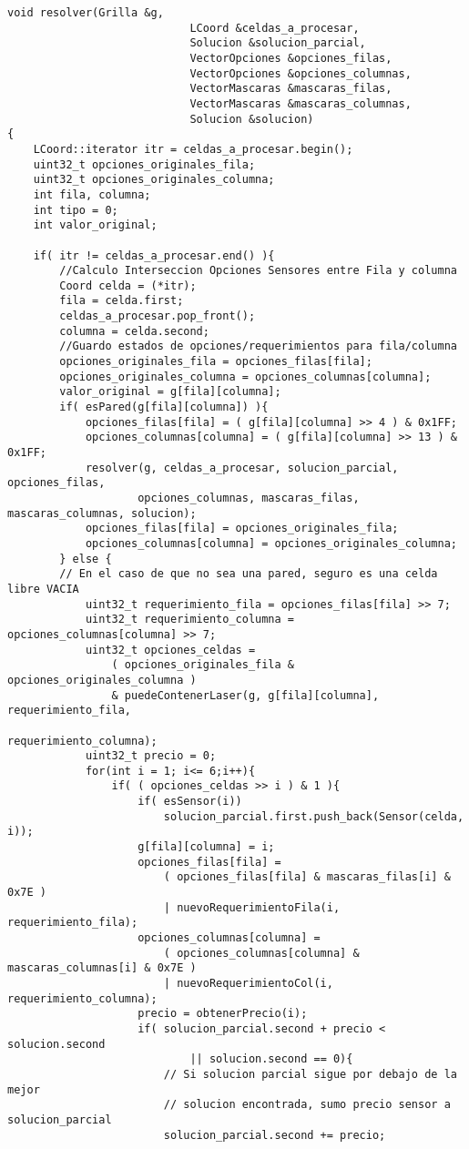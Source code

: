 \documentclass[11pt, a4paper, twoside]{article}
\begin{document}
\clearpage
{}
\begin{lstlisting}
void resolver(Grilla &g,
							LCoord &celdas_a_procesar,
							Solucion &solucion_parcial,
							VectorOpciones &opciones_filas,
							VectorOpciones &opciones_columnas,
							VectorMascaras &mascaras_filas,
							VectorMascaras &mascaras_columnas,
							Solucion &solucion)
{
	LCoord::iterator itr = celdas_a_procesar.begin();
	uint32_t opciones_originales_fila; 
	uint32_t opciones_originales_columna; 
	int fila, columna;
	int tipo = 0;
	int valor_original;
	
	if( itr != celdas_a_procesar.end() ){
		//Calculo Interseccion Opciones Sensores entre Fila y columna
		Coord celda = (*itr);
		fila = celda.first;
		celdas_a_procesar.pop_front();
		columna = celda.second;
		//Guardo estados de opciones/requerimientos para fila/columna
		opciones_originales_fila = opciones_filas[fila];
		opciones_originales_columna = opciones_columnas[columna];
		valor_original = g[fila][columna];
		if( esPared(g[fila][columna]) ){
			opciones_filas[fila] = ( g[fila][columna] >> 4 ) & 0x1FF;
			opciones_columnas[columna] = ( g[fila][columna] >> 13 ) & 0x1FF;
			resolver(g, celdas_a_procesar, solucion_parcial, opciones_filas,
					opciones_columnas, mascaras_filas, mascaras_columnas, solucion);   
			opciones_filas[fila] = opciones_originales_fila;
			opciones_columnas[columna] = opciones_originales_columna;
		} else {
		// En el caso de que no sea una pared, seguro es una celda libre VACIA
			uint32_t requerimiento_fila = opciones_filas[fila] >> 7;
			uint32_t requerimiento_columna = opciones_columnas[columna] >> 7;
			uint32_t opciones_celdas =
				( opciones_originales_fila & opciones_originales_columna )
				& puedeContenerLaser(g, g[fila][columna], requerimiento_fila,
																									 requerimiento_columna);
			uint32_t precio = 0;
			for(int i = 1; i<= 6;i++){
				if( ( opciones_celdas >> i ) & 1 ){
					if( esSensor(i))
						solucion_parcial.first.push_back(Sensor(celda, i));
					g[fila][columna] = i;
					opciones_filas[fila] =
						( opciones_filas[fila] & mascaras_filas[i] & 0x7E )
						| nuevoRequerimientoFila(i, requerimiento_fila);
					opciones_columnas[columna] =
						( opciones_columnas[columna] & mascaras_columnas[i] & 0x7E )
						| nuevoRequerimientoCol(i, requerimiento_columna);
					precio = obtenerPrecio(i);
					if( solucion_parcial.second + precio < solucion.second
							|| solucion.second == 0){
						// Si solucion parcial sigue por debajo de la mejor
						// solucion encontrada, sumo precio sensor a solucion_parcial
						solucion_parcial.second += precio; 
						

\end{lstlisting}
\end{document}
